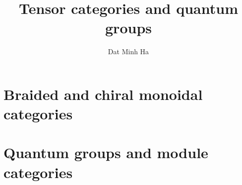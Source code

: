 

\setcounter{chapter}{-1}
\setcounter{section}{-1}





	\title{Tensor categories and quantum groups}
	
	\author{Dat Minh Ha}
	\maketitle
	
	\begin{abstract}
	    
	\end{abstract}
	
	{
      \hypersetup{} 
      \dominitoc
      \tableofcontents %
    }
    
    
    
    \chapter{Braided and chiral monoidal categories}
        \begin{abstract}
            
        \end{abstract}
        
        \minitoc
        
        
        
        
    
    \chapter{Quantum groups and module categories}
        \begin{abstract}
            
        \end{abstract}
        
        \minitoc
        
        
        
        
        
        
    
